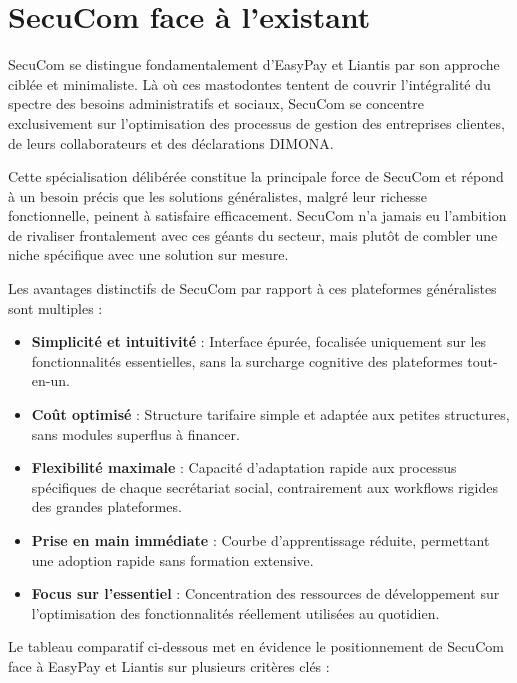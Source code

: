 \section{SecuCom face à l'existant}

SecuCom se distingue fondamentalement d'EasyPay et Liantis par son approche ciblée et minimaliste. Là où ces mastodontes tentent de couvrir l'intégralité du spectre des besoins administratifs et sociaux, SecuCom se concentre exclusivement sur l'optimisation des processus de gestion des entreprises clientes, de leurs collaborateurs et des déclarations DIMONA.

Cette spécialisation délibérée constitue la principale force de SecuCom et répond à un besoin précis que les solutions généralistes, malgré leur richesse fonctionnelle, peinent à satisfaire efficacement. SecuCom n'a jamais eu l'ambition de rivaliser frontalement avec ces géants du secteur, mais plutôt de combler une niche spécifique avec une solution sur mesure.

Les avantages distinctifs de SecuCom par rapport à ces plateformes généralistes sont multiples :

\begin{itemize}
  \item \textbf{Simplicité et intuitivité} : Interface épurée, focalisée uniquement sur les fonctionnalités essentielles, sans la surcharge cognitive des plateformes tout-en-un.
  \item \textbf{Coût optimisé} : Structure tarifaire simple et adaptée aux petites structures, sans modules superflus à financer.
  \item \textbf{Flexibilité maximale} : Capacité d'adaptation rapide aux processus spécifiques de chaque secrétariat social, contrairement aux workflows rigides des grandes plateformes.
  \item \textbf{Prise en main immédiate} : Courbe d'apprentissage réduite, permettant une adoption rapide sans formation extensive.
  \item \textbf{Focus sur l'essentiel} : Concentration des ressources de développement sur l'optimisation des fonctionnalités réellement utilisées au quotidien.
\end{itemize}

Le tableau comparatif ci-dessous met en évidence le positionnement de SecuCom face à EasyPay et Liantis sur plusieurs critères clés :

